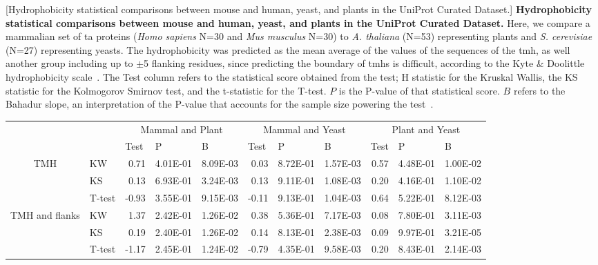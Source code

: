 \begin{table}[htbp]
\centering
{}[Hydrophobicity statistical comparisons between mouse and human, yeast, and plants in the UniProt Curated Dataset.]
{\textbf{Hydrophobicity statistical comparisons between mouse and human, yeast, and plants in the UniProt Curated Dataset.}
Here, we compare a mammalian set of \gls{ta} proteins (\textit{Homo sapiens} N=30 and \textit{Mus musculus} N=30) to \textit{A. thaliana} (N=53) representing plants  and  \textit{S. cerevisiae} (N=27) representing yeasts.
The hydrophobicity was predicted as the mean average of the values of the sequences of the \gls{tmh}, as well another group including up to $\pm$5 flanking residues, since predicting the boundary of \gls{tmh}s is difficult, according to the Kyte \& Doolittle hydrophobicity scale~\cite{Kyte1982}.
The Test column refers to the statistical score obtained from the test; H statistic for the Kruskal Wallis, the KS statistic for the Kolmogorov Smirnov test, and the t-statistic for the T-test.
$P$ is the P\--value of that statistical score.
$B$ refers to the Bahadur slope, an interpretation of the P\--value that accounts for the sample size powering the test~\cite{Bahadur1967, Bahadur1971}.}
    \tiny

    \begin{tabular}{clrrrrrrrrr}
                &       & \multicolumn{3}{c}{Mammal and Plant} & \multicolumn{3}{c}{Mammal and Yeast} & \multicolumn{3}{c}{Plant and Yeast} \\
                &       & \multicolumn{1}{l}{Test} & \multicolumn{1}{l}{P} & \multicolumn{1}{l}{B} & \multicolumn{1}{l}{Test} & \multicolumn{1}{l}{P} & \multicolumn{1}{l}{B} & \multicolumn{1}{l}{Test} & \multicolumn{1}{l}{P} & \multicolumn{1}{l}{B} \\
    \multirow{3}[0]{*}{TMH} &  KW & 0.71  & 4.01E-01 & 8.09E-03 & 0.03  & 8.72E-01 & 1.57E-03 & 0.57  & 4.48E-01 & 1.00E-02 \\
                &  KS & 0.13  & 6.93E-01 & 3.24E-03 & 0.13  & 9.11E-01 & 1.08E-03 & 0.20  & 4.16E-01 & 1.10E-02 \\
                &  T-test & -0.93 & 3.55E-01 & 9.15E-03 & -0.11 & 9.13E-01 & 1.04E-03 & 0.64  & 5.22E-01 & 8.12E-03 \\
    \multirow{3}[0]{*}{TMH and flanks} &  KW & 1.37  & 2.42E-01 & 1.26E-02 & 0.38  & 5.36E-01 & 7.17E-03 & 0.08  & 7.80E-01 & 3.11E-03 \\
                &  KS & 0.19  & 2.40E-01 & 1.26E-02 & 0.14  & 8.13E-01 & 2.38E-03 & 0.09  & 9.97E-01 & 3.21E-05 \\
                &  T-test & -1.17 & 2.45E-01 & 1.24E-02 & -0.79 & 4.35E-01 & 9.58E-03 & 0.20  & 8.43E-01 & 2.14E-03 \\
    \end{tabular}%
                    \label{table:speciestableuniprotstats}
    \end{table}%

